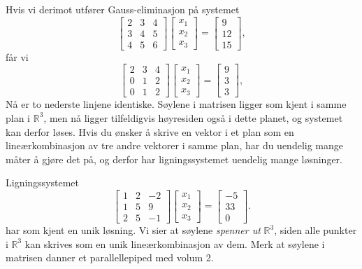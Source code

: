 \begin{ex}
	Hvis vi derimot utf{\o}rer Gauss-eliminasjon p{\aa} systemet
	\begin{equation*}
	\begin{bmatrix}2 & 3& 4 \\  3& 4 & 5  \\ 4 &5 & 6 \end{bmatrix}\begin{bmatrix}x_{1} \\  x_{2}\\ x_{3} \end{bmatrix}=
	\begin{bmatrix}9 \\ 12\\ 15 \end{bmatrix},
	\end{equation*}
	f{\aa}r vi 
	\begin{equation*}
	\begin{bmatrix}2 & 3& 4 \\  0& 1 & 2  \\ 0 & 1 & 2 \end{bmatrix}\begin{bmatrix}x_{1} \\  x_{2}\\ x_{3} \end{bmatrix}=
	\begin{bmatrix}9 \\ 3\\ 3 \end{bmatrix},
	\end{equation*}
	Nå er to nederste linjene identiske. Søylene i matrisen ligger som kjent i samme plan i $\mathbb{R}^{3}$, men nå ligger tilfeldigvis høyresiden også i dette planet, og systemet kan derfor løses. Hvis du ønsker å skrive en vektor i et plan som en lineærkombinasjon av tre andre vektorer i samme plan, har du uendelig mange måter å gjøre det på, og derfor har ligningssystemet uendelig mange løsninger.
\end{ex}

\begin{ex}
	Ligningssystemet 
	\begin{equation*}
	\begin{bmatrix}
	1  &  2  &  -2   \\
	1  & 5  &  9  \\
	2  & 5  &  -1  
	\end{bmatrix}
	\begin{bmatrix}
	x_1   \\
	x_2 \\
	x_3 
	\end{bmatrix}=
	\begin{bmatrix}
	-5   \\
	33 \\
	0
	\end{bmatrix}.
	\end{equation*}
	har som kjent en unik løsning. Vi sier at søylene \emph{spenner ut} $\mathbb{R}^3$, siden alle punkter i $\mathbb{R}^3$ kan skrives som en unik lineærkombinasjon av dem. Merk at søylene i matrisen danner et parallellepiped med volum 2.
\end{ex}

